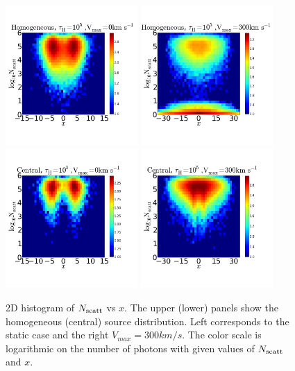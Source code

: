 \documentclass{emulateapj}
\begin{document}
\begin{figure}
\begin{center}
  \includegraphics[width=0.45\textwidth]{2dHistogram0t5HOM.png}
  \includegraphics[width=0.45\textwidth]{2dHistogram300t5HOM.png}\\
  \includegraphics[width=0.45\textwidth]{2dHistogram0t5.png}
  \includegraphics[width=0.45\textwidth]{2dHistogram300t5.png}    
\end{center}
    \caption{2D histogram of $N_{\rm scatt}$ vs $x$. The upper (lower) panels
      show the homogeneous (central) source distribution. Left
      corresponds to the static case and the right
      $V_{max}=300km/s$. The color scale is logarithmic on the
      number of photons with given values of $N_{\rm scatt}$ and
      $x$. \label{fig:Nscatt2D}}   
\end{figure}
\end{document}
